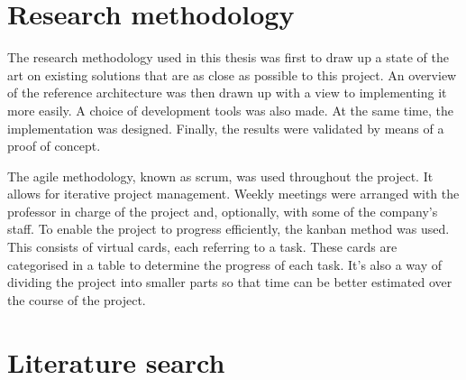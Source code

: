 \section{Research methodology}

The research methodology used in this thesis was first to draw up a state of the art on existing solutions that are as close as possible to this project. An overview of the reference architecture was then drawn up with a view to implementing it more easily. A choice of development tools was also made. At the same time, the implementation was designed. Finally, the results were validated by means of a proof of concept.

The agile methodology, known as \gls{scrum}, was used throughout the project. It allows for iterative project management. Weekly meetings were arranged with the professor in charge of the project and, optionally, with some of the company's staff. To enable the project to progress efficiently, the \gls{kanban} method was used. This consists of virtual cards, each referring to a task. These cards are categorised in a table to determine the progress of each task. It's also a way of dividing the project into smaller parts so that time can be better estimated over the course of the project.


\section{Literature search}

